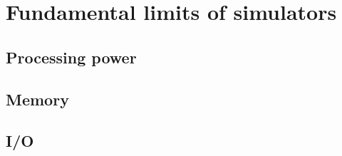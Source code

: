 \chapter{Fundamental limits of simulators}
\section{Processing power}
\section{Memory}
\section{I/O}